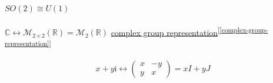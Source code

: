 \documentclass[
]{book}
\theoremstyle{definition}
\theoremstyle{definition}
\theoremstyle{definition}
\theoremstyle{definition}
\theoremstyle{remark}
\begin{document}
\paragraph{\texorpdfstring{\(SO\left(2\right)\cong U\left(1\right)\)}{SO\textbackslash left(2\textbackslash right)\textbackslash cong U\textbackslash left(1\textbackslash right)}}\label{soleft2rightcong-uleft1right}

\(\mathbb{C}\leftrightarrow\mathcal{M}_{2\times2}\left(\mathbb{R}\right)=\mathcal{M}_{2}\left(\mathbb{R}\right)\) \hyperref[complex-group-representation]{complex group representation}\textsuperscript{{[}\ref{complex-group-representation}{]}}

\[
x+y\mathrm{i}\leftrightarrow\begin{pmatrix}x & -y\\
y & x
\end{pmatrix}=xI+yJ
\]
\end{document}
